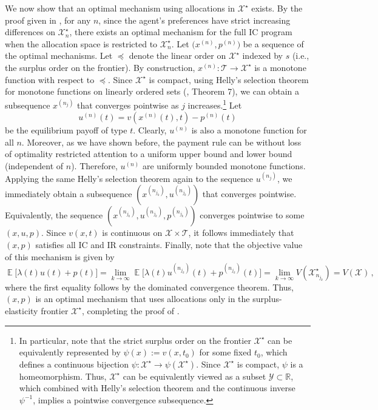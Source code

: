 \documentclass[12pt,letterpaper]{article}
\newenvironment{original}{\color{black}\noindent}{}
\theoremstyle{plain}
\theoremstyle{definition}
\theoremstyle{remark}
\DeclareMathOperator{\E}{\mathds{E}}
\newcommand{\R}{\mathds{R}}
\newcommand{\Y}{\mathcal{Y}}
\renewcommand{\1}{\mathds{1}}
\newcommand{\X}{\mathcal{X}}
\theoremstyle{definition}
\begin{document}
\begin{original}
We now show that an optimal mechanism using allocations in $\X^\star$ exists. By the proof given in , for any $n$, since the agent's preferences have strict increasing differences on $\X^\star_n$, there exists an optimal mechanism for the full IC program when the allocation space is restricted to $\X^\star_n$. Let $\big(x^{(n)}, p^{(n)}\big)$ be a sequence of the optimal mechanisms. Let $\preceq$ denote the linear order on $\X^\star$ indexed by $s$ (i.e., the surplus order on the frontier). By construction, $x^{(n)}: \mathcal{T} \rightarrow \X^\star$ is a monotone function with respect to $\preceq$. Since $\X^\star$ is compact, using Helly's selection theorem for monotone functions on linearly ordered sets (\citealt{fuchino1999theorem}, Theorem 7), we can obtain a subsequence $x^{(n_j)}$ that converges pointwise as $j$ increases.\footnote{In particular, note that the strict surplus order on the frontier $\X^\star$ can be equivalently represented by $\psi(x) := v(x, t_0)$ for some fixed $t_0$, which defines a continuous bijection $\psi: \X^\star \rightarrow \psi(\X^\star)$. Since $\X^\star$ is compact, $\psi$ is a homeomorphism. Thus, $\X^\star$ can be equivalently viewed as a subset $\Y \subset \R$, which combined with Helly's selection theorem and the continuous inverse $\psi^{-1}$, implies a pointwise convergence subsequence.}  Let
\[u^{(n)}(t) = v(x^{(n)}(t), t) - p^{(n)}(t)\]
be the equilibrium payoff of type $t$. Clearly, $u^{(n)}$ is also a monotone function for all $n$. Moreover, as we have shown before, the payment rule can be without loss of optimality restricted attention to a uniform upper bound and lower bound (independent of $n$). Therefore, $u^{(n)}$ are uniformly bounded monotone functions. Applying the same Helly's selection theorem again to the sequence $u^{(n_j)}$, we immediately obtain a subsequence $(x^{(n_{j_k})}, u^{(n_{j_k})})$ that converges pointwise. Equivalently, the sequence $(x^{(n_{j_k})}, u^{(n_{j_k})}, p^{(n_{j_k})})$ converges pointwise to some $(x, u, p)$. Since $v(x, t)$ is continuous on $\X \times \mathcal{T}$, it follows immediately that $(x, p)$ satisfies all IC and IR constraints. Finally, note that the objective value of this mechanism is given by
\[\E\big[\lambda(t) u(t) + p(t)\big] = \lim_{k \rightarrow \infty }\E\big[\lambda(t) u^{(n_{j_k})}(t) + p^{(n_{j_k})}(t)\big] = \lim_{k \rightarrow \infty} V(\X^\star_{n_{j_k}}) = V(\X)\,,\]
where the first equality follows by the dominated convergence theorem. Thus, $(x, p)$ is an optimal mechanism that uses allocations only in the surplus-elasticity frontier $\X^\star$, completing the proof of .
\end{original}
\end{document}
